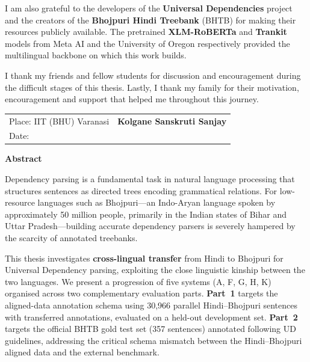 \documentclass[12pt,a4paper,oneside]{report}
\newcommand{\bho}{Bhojpuri}
\newcommand{\hi}{Hindi}
\begin{document}
\vspace{0.5cm}
\noindent I am also grateful to the developers of the \textbf{Universal Dependencies}
project and the creators of the \textbf{Bhojpuri Hindi Treebank} (BHTB) for making
their resources publicly available. The pretrained \textbf{XLM-RoBERTa} and
\textbf{Trankit} models from Meta AI and the University of Oregon respectively provided
the multilingual backbone on which this work builds.

\vspace{0.5cm}
\noindent I thank my friends and fellow students for discussion and encouragement
during the difficult stages of this thesis. Lastly, I thank my family for their
motivation, encouragement and support that helped me throughout this journey.

\vspace{1.5cm}
\begin{tabular}{@{}p{6cm}p{8cm}@{}}
Place: IIT (BHU) Varanasi & \textbf{Kolgane Sanskruti Sanjay} \\
Date: & \\
\end{tabular}

\newpage
\thispagestyle{plain}
\begin{center}
{\Large \textbf{Abstract}}
\end{center}
\vspace{0.8cm}

\noindent Dependency parsing is a fundamental task in natural language processing that
structures sentences as directed trees encoding grammatical relations. For
low-resource languages such as \bho{}---an Indo-Aryan language spoken by approximately
50 million people, primarily in the Indian states of Bihar and Uttar Pradesh---building
accurate dependency parsers is severely hampered by the scarcity of annotated
treebanks.

\vspace{0.4cm}
\noindent This thesis investigates \textbf{cross-lingual transfer} from \hi{} to
\bho{} for Universal Dependency parsing, exploiting the close linguistic kinship
between the two languages. We present a progression of five systems (A, F, G, H, K)
organised across two complementary evaluation parts. \textbf{Part~1}
targets the aligned-data annotation schema using 30,966 parallel Hindi--Bhojpuri
sentences with transferred annotations, evaluated on a held-out development set.
\textbf{Part~2} targets the official BHTB gold test set (357 sentences)
annotated following UD guidelines, addressing the critical schema mismatch between
the Hindi--Bhojpuri aligned data and the external benchmark.
\end{document}
